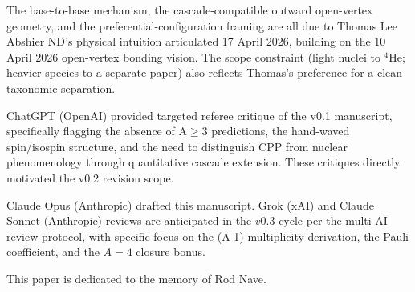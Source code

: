 \documentclass[11pt,letterpaper]{article}
\begin{document}
The base-to-base mechanism, the cascade-compatible outward open-vertex geometry, and the preferential-configuration framing are all due to Thomas Lee Abshier ND's physical intuition articulated 17 April 2026, building on the 10 April 2026 open-vertex bonding vision. The scope constraint (light nuclei to ${}^{4}\mathrm{He}$; heavier species to a separate paper) also reflects Thomas's preference for a clean taxonomic separation.

ChatGPT (OpenAI) provided targeted referee critique of the v0.1 manuscript, specifically flagging the absence of A$\geq$3 predictions, the hand-waved spin/isospin structure, and the need to distinguish CPP from nuclear phenomenology through quantitative cascade extension. These critiques directly motivated the v0.2 revision scope.

Claude Opus (Anthropic) drafted this manuscript. Grok (xAI) and Claude Sonnet (Anthropic) reviews are anticipated in the $v0.3$ cycle per the multi-AI review protocol, with specific focus on the (A-1) multiplicity derivation, the Pauli coefficient, and the $A=4$ closure bonus.

This paper is dedicated to the memory of Rod Nave.
\end{document}
